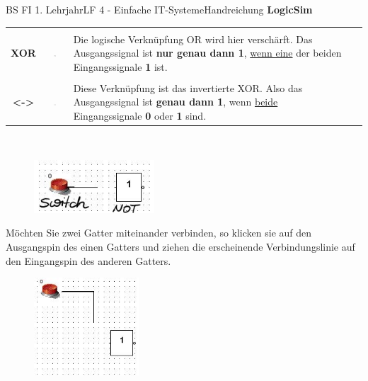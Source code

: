 \documentclass[11pt,oneside,openany,headings=optiontotoc,11pt,numbers=noenddot]{article}
\begin{document}
\begin{worksheet}{BS FI 1. Lehrjahr}{LF 4 - Einfache IT-Systeme}{Handreichung \textbf{LogicSim}}
\begin{tabularx}{\textwidth}{c|c|X|c}
			\hline
			& & & \\
			\textbf{XOR} & \includegraphics[width=0.1\textwidth,align=t]{../99_Bilder/XOR.jpg} & Die logische Verknüpfung OR wird hier verschärft. Das Ausgangssignal ist \textbf{nur genau dann 1}, \underline{wenn eine} der beiden Eingangssignale \textbf{1} ist. & \\
			\hline
			& & & \\
			\textbf{<->} & \includegraphics[width=0.1\textwidth, align=t]{../99_Bilder/equi.jpg} & Diese Verknüpfung ist das invertierte XOR. Also das Ausgangssignal ist \textbf{genau dann 1}, wenn \underline{beide} Eingangssignale \textbf{0} oder \textbf{1} sind. & \\
			\hline
		\end{tabularx}\\
		\par\bigskip\noindent
		\begin{figure}
			\vspace{-20pt}
			\includegraphics[width=0.4\textwidth]{../99_Bilder/connect.jpg}
		\end{figure}
		Möchten Sie zwei Gatter miteinander verbinden, so klicken sie auf den Ausgangspin des einen Gatters und ziehen die erscheinende Verbindungslinie auf den Eingangspin des anderen Gatters.\\
		\clearpage
		\par\noindent
		\begin{figure}
			\hspace{-20pt}
			\includegraphics[width=0.35\textwidth]{../99_Bilder/connection.jpg}

\end{figure}
\end{worksheet}
\end{document}
